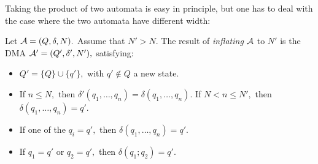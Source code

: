 \noindent
Taking the product of two automata is easy in principle, but
one has to deal with the case where the two automata have different
width:

\begin{definition}
   \label{Def_inflation}
   Let $ {\cal A} = ( Q, \delta, N ). $
   Assume that $ N' > N. $
   The result of \emph{inflating} $ {\cal A} $ to $ N' $
   is the DMA $ {\cal A}' = ( Q', \delta', N' ), $ satisfying: 
   \begin{itemize}
   \item
      $ Q' = \{ Q \} \cup \{ q' \}, $ with $ q' \not \in Q $ a new state.
   \item
      If $ n \leq N, $ then $ \delta'( q_1, \ldots, q_n ) = \delta(q_1, \ldots, q_n). $
      If $ N < n \leq N', $ then $ \delta( q_1, \ldots, q_n ) = q'. $
   \item
      If one of the $ q_i = q', $ then $ \delta(q_1, \ldots, q_n ) = q'. $ 
   \item
      If $ q_1 = q' $ or $ q_2 = q', $ then $ \delta(q_1;q_2) = q'. $ 
   \end{itemize}
\end{definition}

